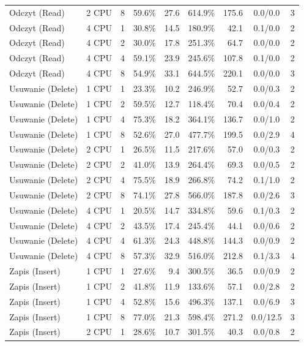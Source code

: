 \begin{table}[ht]
{\begin{tabular}{llcrrrrcc}
Odczyt (Read) & 2 CPU & 8 & 59.6\% & 27.6 & 614.9\% & 175.6 & 0.0/0.0 & 3 \\
Odczyt (Read) & 4 CPU & 1 & 30.8\% & 14.5 & 180.9\% & 42.1 & 0.1/0.0 & 2 \\
Odczyt (Read) & 4 CPU & 2 & 30.0\% & 17.8 & 251.3\% & 64.7 & 0.0/0.0 & 2 \\
Odczyt (Read) & 4 CPU & 4 & 59.1\% & 23.9 & 245.6\% & 107.8 & 0.1/0.0 & 2 \\
Odczyt (Read) & 4 CPU & 8 & 54.9\% & 33.1 & 644.5\% & 220.1 & 0.0/0.0 & 3 \\
Usuwanie (Delete) & 1 CPU & 1 & 23.3\% & 10.2 & 246.9\% & 52.7 & 0.0/0.3 & 2 \\
Usuwanie (Delete) & 1 CPU & 2 & 59.5\% & 12.7 & 118.4\% & 70.4 & 0.0/0.4 & 2 \\
Usuwanie (Delete) & 1 CPU & 4 & 75.3\% & 18.2 & 364.1\% & 136.7 & 0.0/1.0 & 2 \\
Usuwanie (Delete) & 1 CPU & 8 & 52.6\% & 27.0 & 477.7\% & 199.5 & 0.0/2.9 & 4 \\
Usuwanie (Delete) & 2 CPU & 1 & 26.5\% & 11.5 & 217.6\% & 57.0 & 0.0/0.3 & 2 \\
Usuwanie (Delete) & 2 CPU & 2 & 41.0\% & 13.9 & 264.4\% & 69.3 & 0.0/0.5 & 2 \\
Usuwanie (Delete) & 2 CPU & 4 & 75.5\% & 18.9 & 266.8\% & 74.2 & 0.1/1.0 & 2 \\
Usuwanie (Delete) & 2 CPU & 8 & 74.1\% & 27.8 & 566.0\% & 187.8 & 0.0/2.6 & 3 \\
Usuwanie (Delete) & 4 CPU & 1 & 20.5\% & 14.7 & 334.8\% & 59.6 & 0.1/0.3 & 2 \\
Usuwanie (Delete) & 4 CPU & 2 & 43.5\% & 17.4 & 245.4\% & 44.1 & 0.0/0.6 & 2 \\
Usuwanie (Delete) & 4 CPU & 4 & 61.3\% & 24.3 & 448.8\% & 144.3 & 0.0/0.9 & 2 \\
Usuwanie (Delete) & 4 CPU & 8 & 57.3\% & 32.9 & 516.0\% & 212.8 & 0.1/3.3 & 4 \\
Zapis (Insert) & 1 CPU & 1 & 27.6\% & 9.4 & 300.5\% & 36.5 & 0.0/0.9 & 2 \\
Zapis (Insert) & 1 CPU & 2 & 41.8\% & 11.9 & 133.6\% & 57.1 & 0.0/2.8 & 2 \\
Zapis (Insert) & 1 CPU & 4 & 52.8\% & 15.6 & 496.3\% & 137.1 & 0.0/6.9 & 3 \\
Zapis (Insert) & 1 CPU & 8 & 77.0\% & 21.3 & 598.4\% & 271.2 & 0.0/12.5 & 3 \\
Zapis (Insert) & 2 CPU & 1 & 28.6\% & 10.7 & 301.5\% & 40.3 & 0.0/0.8 & 2 \\

\end{tabular}}
\end{table}
